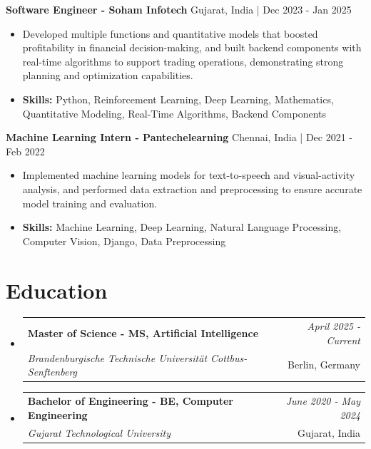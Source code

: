 \documentclass[a4paper,11pt]{article}
\makeatletter
\newcommand{\resumeSubheading}[4]{
\vspace{0.5mm}\item
    \begin{tabular*}{\linewidth}[t]{l@{\extracolsep{\fill}}r}
        \textbf{#1} & \textit{\footnotesize{#4}} \\
        \textit{\footnotesize{#3}} &  \footnotesize{#2}\\
    \end{tabular*}
    \vspace{-2.4mm}
}
\makeatother
\begin{document}
\vspace{1mm}
  \textbf{Software Engineer - Soham Infotech} \hfill Gujarat, India | Dec 2023 - Jan 2025
\vspace{-1.5mm} %
\begin{itemize}
  \item Developed multiple functions and quantitative models that boosted profitability in financial decision-making, and built backend components with real-time algorithms to support trading operations, demonstrating strong planning and optimization capabilities.

\vspace{-2mm}
  \item \textbf{Skills:} Python, Reinforcement Learning, Deep Learning, Mathematics, Quantitative Modeling, Real-Time Algorithms, Backend Components
\end{itemize}

\vspace{1mm}
  \textbf{Machine Learning Intern - Pantechelearning} \hfill Chennai, India | Dec 2021 - Feb 2022
\vspace{-1.5mm} %
\begin{itemize}
  \item Implemented machine learning models for text-to-speech and visual-activity analysis, and performed data extraction and preprocessing to ensure accurate model training and evaluation.
\vspace{-2mm}
  \item \textbf{Skills:} Machine Learning, Deep Learning, Natural Language Processing, Computer Vision, Django, Data Preprocessing
\end{itemize}\section{\textbf{Education}}
\vspace{-0.4mm}

\begin{itemize}[leftmargin=0.15in, label={}]
\resumeSubheading
{Master of Science - MS, Artificial Intelligence }{Berlin, Germany}
{Brandenburgische Technische Universität Cottbus-Senftenberg  }{April 2025 - Current}

\vspace{1.0mm} %
\resumeSubheading
{Bachelor of Engineering - BE, Computer Engineering  }{Gujarat, India}
{Gujarat Technological University }{June 2020 - May 2024}

\end{itemize}
\end{document}
